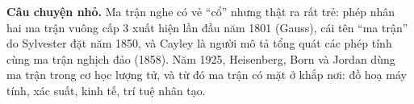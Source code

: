 \documentclass[11pt, a4paper, twoside]{article}
\begin{document}
\begin{tcolorbox}[colback=white, colframe=maincolor!40, arc=5pt, boxrule=0.8pt, left=12pt, right=12pt, top=6pt, bottom=6pt]
\small\textbf{\color{maincolor}Câu chuyện nhỏ.} Ma trận nghe có vẻ ``cổ'' nhưng thật ra rất trẻ: phép nhân hai ma trận vuông cấp 3 xuất hiện lần đầu năm 1801 (Gauss), cái tên ``ma trận'' do Sylvester đặt năm 1850, và Cayley là người mô tả tổng quát các phép tính cùng ma trận nghịch đảo (1858). Năm 1925, Heisenberg, Born và Jordan dùng ma trận trong cơ học lượng tử, và từ đó ma trận có mặt ở khắp nơi: đồ hoạ máy tính, xác suất, kinh tế, trí tuệ nhân tạo.
\end{tcolorbox}
\end{document}
